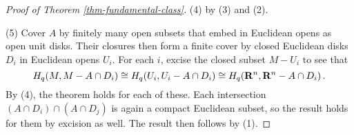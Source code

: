 \begin{proof}[Proof of Theorem \ref{thm-fundamental-class}]
(4) by (3) and (2). 

(5) Cover $A$ by finitely many open subsets that embed in Euclidean
opens as open unit disks. Their closures then form a finite cover by closed
Euclidean disks $D_i$ in Euclidean opens $U_i$. For each $i$, 
excise the closed subset $M-U_i$ to see that
\[
H_q(M,M-A\cap D_i)\cong H_q(U_i,U_i-A\cap D_i)\cong 
H_q(\mathbf R^n,\mathbf R^n-A\cap D_i)\,.
\]
By (4), the theorem holds for each of these. Each intersection 
$(A\cap D_i)\cap(A\cap D_j)$ is again a compact Euclidean subset, 
so the result holds for them by excision as well. The result then
follows by (1).
\end{proof}
 








